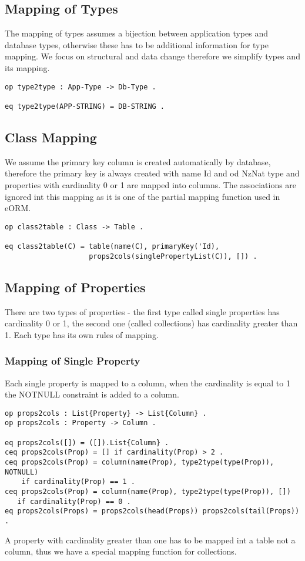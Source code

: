 \documentclass[11pt]{article}
\begin{document}
\subsection{Mapping of Types}
The mapping of types assumes a bijection between application types and database types, otherwise these has to be additional information for type mapping. We focus on structural and data change therefore we simplify types and its mapping.
\begin{verbatim}
op type2type : App-Type -> Db-Type .

eq type2type(APP-STRING) = DB-STRING .
\end{verbatim}

\subsection{Class Mapping}
We assume the primary key column is created automatically by database, therefore the primary key is always created with name Id and od NzNat type and properties with cardinality 0 or 1 are mapped into columns. The associations are ignored int this mapping as it is one of the partial mapping function used in eORM.

\begin{verbatim}
op class2table : Class -> Table .

eq class2table(C) = table(name(C), primaryKey('Id), 
                    props2cols(singlePropertyList(C)), []) .
\end{verbatim}

\subsection{Mapping of Properties}
There are two types of properties - the first type called single properties has cardinality 0 or 1, the second one (called collections) has cardinality greater than 1. Each type has its own rules of mapping.

\subsubsection{Mapping of Single Property}
Each single property is mapped to a column, when the cardinality is equal to 1 the NOTNULL constraint is added to a column. 
\begin{verbatim}
op props2cols : List{Property} -> List{Column} .
op props2cols : Property -> Column .

eq props2cols([]) = ([]).List{Column} .
ceq props2cols(Prop) = [] if cardinality(Prop) > 2 .
ceq props2cols(Prop) = column(name(Prop), type2type(type(Prop)), NOTNULL)
    if cardinality(Prop) == 1 .
ceq props2cols(Prop) = column(name(Prop), type2type(type(Prop)), []) 
   if cardinality(Prop) == 0 .
eq props2cols(Props) = props2cols(head(Props)) props2cols(tail(Props)) .
\end{verbatim}
A property with cardinality greater than one has to be mapped int a table not a column, thus we have a special mapping function for collections.
\end{document}
